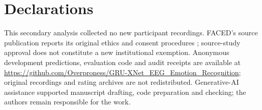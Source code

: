 \documentclass[11pt,a4paper]{article}
\begin{document}
\section*{Declarations}
This secondary analysis collected no new participant recordings. FACED's source publication reports its original ethics and consent procedures \cite{chen2023faced}; source-study approval does not constitute a new institutional exemption. Anonymous development predictions, evaluation code and audit receipts are available at \url{https://github.com/Overproness/GRU-XNet_EEG_Emotion_Recognition}; original recordings and rating archives are not redistributed. Generative-AI assistance supported manuscript drafting, code preparation and checking; the authors remain responsible for the work.


\begingroup
\small
\setlength{\bibsep}{3pt}

\endgroup
\end{document}
